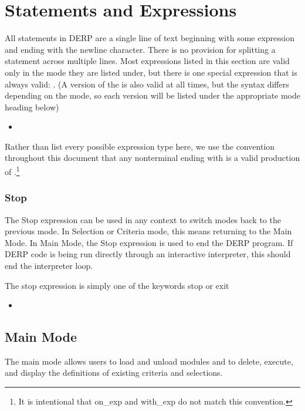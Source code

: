 \section{Statements and Expressions}
All statements in DERP are a single line of text beginning with some expression
and ending with the newline character. There is no provision for splitting a
statement across multiple lines. Most expressions listed in this section are
valid only in the mode they are listed under, but there is one special expression
that is always valid: . (A version of the 
is also valid at all times, but the syntax differs depending on the mode, so each version
will be listed under the appropriate mode heading below)
\begin{itemize}[leftmargin=2in]
    \item[\nonterminal{statement}] \bnf{:}  
\end{itemize}


Rather than list every possible expression type here, we use the convention throughout
this document that any nonterminal ending with  is a valid production of
.\footnote{It is intentional that on\_exp and with\_exp do not match this convention.}

\subsubsection{Stop}
The Stop expression can be used in any context to switch modes back to the previous mode. In Selection
or Criteria mode, this means returning to the Main Mode. In Main Mode, the Stop expression is used to
end the DERP program. If DERP code is being run directly through an interactive interpreter, this should
end the interpreter loop.

The stop expression is simply one of the keywords stop or exit
\begin{itemize}[leftmargin=2in]
    \item[\nonterminal{stop\_expression}] \bnf{:}  \bnf{|} 
\end{itemize}

\subsection{Main Mode}\label{mainmode}
The main mode allows users to load and unload modules and to delete, execute, and display the definitions
of existing criteria and selections.

